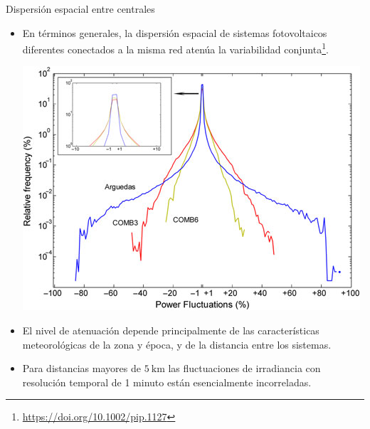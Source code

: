\documentclass[aspectratio=169, usenames,svgnames,dvipsnames]{beamer}
\begin{document}
\begin{frame}[label={sec:org0ed67c2}]{Dispersión espacial entre centrales}
\begin{itemize}
\item En términos generales, la \alert{dispersión espacial de sistemas
fotovoltaicos diferentes} conectados a la misma red \alert{atenúa} la
variabilidad conjunta\footnote{\url{https://doi.org/10.1002/pip.1127}}.

\begin{center}
\includegraphics[height=0.5\textheight]{../figs/Variabilidad_DispersionGeografica_Plantas.png}
\end{center}

\item El \alert{nivel de atenuación depende} principalmente de las
\alert{características meteorológicas} de la zona y época, y de la
\alert{distancia} entre los sistemas.

\item Para \alert{distancias mayores de \(\SI{5}{\kilo\meter}\)} las fluctuaciones
de irradiancia con resolución temporal de 1 minuto están
esencialmente \alert{incorreladas}.
\end{itemize}
\end{frame}
\end{document}
